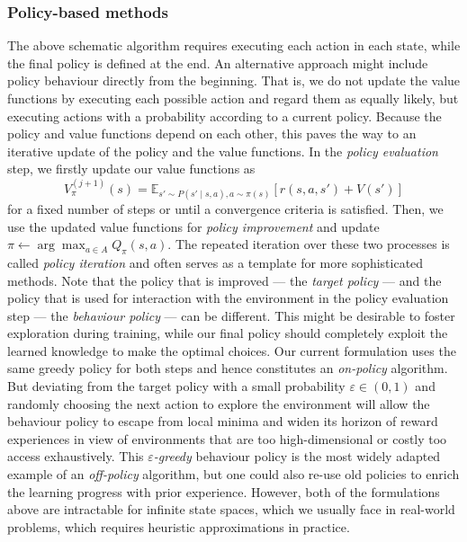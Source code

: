 \documentclass[a4paper, 11pt]{article}
\begin{document}
	\subsubsection{Policy-based methods}
	The above schematic algorithm requires executing each action in each state, while the final policy is defined at the end. An alternative approach might include policy behaviour directly from the beginning. That is, we do not update the value functions by executing each possible action and regard them as equally likely, but executing actions with a probability according to a current policy. Because the policy and value functions depend on each other, this paves the way to an iterative update of the policy and the value functions. In the \textit{policy evaluation} step, we firstly update our value functions as
	\[V_\pi^{(j+1)}(s)=\mathbb{E}_{s'\sim P(s'\mid s,a),a\sim \pi(s)}\left[r(s,a,s')+V(s')\right]\]
	for a fixed number of steps or until a convergence criteria is satisfied. Then, we use the updated value functions for \textit{policy improvement} and update $\pi \leftarrow \arg \max_{a\in A}Q_\pi(s,a)$. The repeated iteration over these two processes is called \textit{policy iteration} and often serves as a template for more sophisticated methods.
	Note that the policy that is improved --- the \textit{target policy} --- and the policy that is used for interaction with the environment in the policy evaluation step  --- the \textit{behaviour policy} --- can be different.
	This might be desirable to foster exploration during training, while our final policy should completely exploit the learned knowledge to make the optimal choices. Our current formulation uses the same greedy policy for both steps and hence constitutes an \textit{on-policy} algorithm. But deviating from the target policy with a small probability $\varepsilon\in(0,1)$ and randomly choosing the next action to explore the environment will allow the behaviour policy to escape from local minima and widen its horizon of reward experiences in view of environments that are too high-dimensional or costly too access exhaustively. This \textit{$\varepsilon$-greedy} behaviour policy is the most widely adapted example of an \textit{off-policy} algorithm, but one could also re-use old policies to enrich the learning progress with prior experience. 
	However, both of the formulations above are intractable for infinite state spaces, which we usually face in real-world problems, which requires heuristic approximations in practice.
\end{document}

